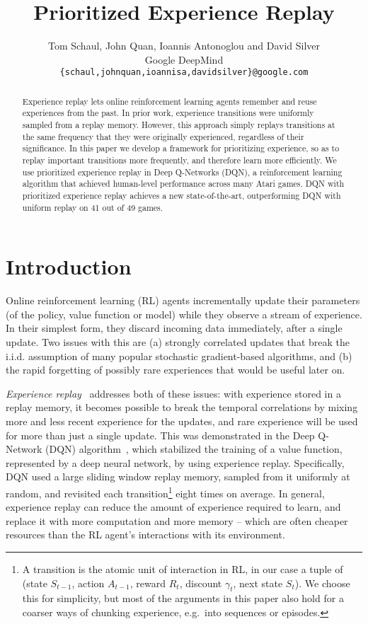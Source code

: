 \documentclass[a4paper]{article}
\title{Prioritized Experience Replay}
\author{Tom Schaul, John Quan, Ioannis Antonoglou and David Silver\\
Google DeepMind\\
\texttt{\{schaul,johnquan,ioannisa,davidsilver\}@google.com} \\
}
\begin{document}
\maketitle

\begin{abstract}
Experience replay lets online reinforcement learning agents remember and reuse experiences from the past. In prior work, experience transitions were uniformly sampled from a replay memory. However, this approach simply replays transitions at the same frequency that they were originally experienced, regardless of their significance. In this paper we develop a framework for prioritizing experience, so as to replay important transitions more frequently, and therefore learn more efficiently. We use prioritized experience replay in Deep Q-Networks (DQN), a reinforcement learning algorithm that achieved human-level performance across many Atari games. DQN with prioritized experience replay achieves a new state-of-the-art, outperforming DQN with uniform replay on 41 out of 49 games.
\end{abstract}

\section{Introduction}
Online reinforcement learning (RL) agents incrementally update their parameters
(of the policy, value function or model) while they observe a stream of
experience. In their simplest form, they discard incoming data immediately, after a single update.
Two issues with this are (a) strongly correlated updates that break the i.i.d. assumption 
of many popular stochastic gradient-based algorithms, and (b) the rapid forgetting of possibly
rare experiences that would be useful later on.

\emph{Experience replay}~\citep{lin-er} addresses both of these issues: with experience stored in a replay memory,
it becomes possible to break the temporal correlations by mixing more and less recent experience for the updates,
and rare experience will be used for more than just a single update.
This was demonstrated in the Deep Q-Network (DQN) algorithm~\citep{dqn-workshop,dqn-nature}, which stabilized the training of
a value function, represented by a deep neural network, by using experience replay. Specifically, DQN used a large sliding window replay memory, sampled from it uniformly at random, and revisited each transition\footnote{
A transition is the atomic unit of interaction in RL, in our case a tuple of 
(state $S_{t-1}$, action $A_{t-1}$, reward $R_{t}$, discount $\gamma_{t}$, next state $S_{t}$). 
We choose this for simplicity, but most of the arguments in this paper also hold for a coarser ways of chunking experience, e.g.\ into sequences or episodes.
}
eight times on average.
In general, experience replay can reduce the amount of experience required to learn,
and replace it with more computation and more memory -- which are often cheaper resources than the RL agent's interactions with its environment.
\end{document}
